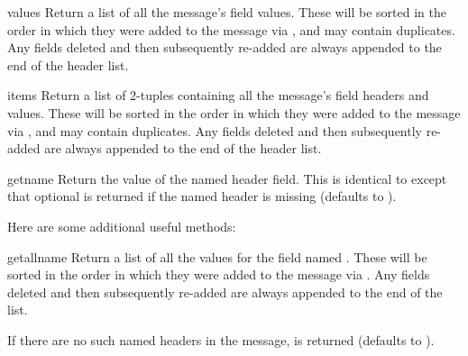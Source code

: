 \documentclass{howto}
\begin{document}
\begin{methoddesc}[Message]{values}{}
Return a list of all the message's field values.  These will be sorted
in the order in which they were added to the message via
, and may contain duplicates.  Any fields
deleted and then subsequently re-added are always appended to the end
of the header list.
\end{methoddesc}

\begin{methoddesc}[Message]{items}{}
Return a list of 2-tuples containing all the message's field headers and
values.  These will be sorted in the order in which they were added to
the message via , and may contain duplicates.
Any fields deleted and then subsequently re-added are always appended
to the end of the header list.
\end{methoddesc}

\begin{methoddesc}[Message]{get}{name}
Return the value of the named header field.  This is identical to
 except that optional  is returned
if the named header is missing (defaults to ).
\end{methoddesc}

Here are some additional useful methods:

\begin{methoddesc}[Message]{getall}{name}
Return a list of all the values for the field named .  These
will be sorted in the order in which they were added to the message
via .  Any fields
deleted and then subsequently re-added are always appended to the end
of the list.

If there are no such named headers in the message,  is
returned (defaults to ).
\end{methoddesc}
\end{document}
